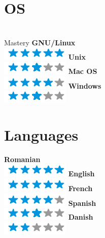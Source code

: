 \documentclass[]{friggeri-cv}
\begin{document}
\begin{aside}
  \section{OS}\\{Mastery}
    \textbf{GNU/Linux}\\ \includegraphics[scale=0.30]{img/5stars.png}
    \textbf{Unix}\\ \includegraphics[scale=0.30]{img/3stars.png}
    \textbf{Mac OS}\\\includegraphics[scale=0.30]{img/4stars.png}
    \textbf{Windows}\\ \includegraphics[scale=0.30]{img/3stars.png}
    ~
  
  \section{Languages}
    \textbf{Romanian}\\ \includegraphics[scale=0.30]{img/5stars.png}
    \textbf{English}\\ \includegraphics[scale=0.30]{img/5stars.png}
    \textbf{French}\\ \includegraphics[scale=0.30]{img/4stars.png}
    \textbf{Spanish}\\ \includegraphics[scale=0.30]{img/3stars.png}
    \textbf{Danish}\\ \includegraphics[scale=0.30]{img/2stars.png}
    ~
    
\end{aside}
\end{document}
